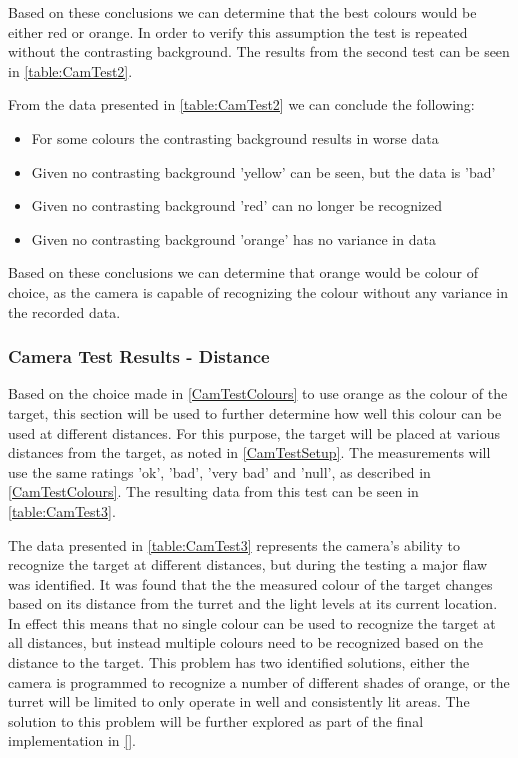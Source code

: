 Based on these conclusions we can determine that the best colours would be
either red or orange. In order to verify this assumption the test is repeated
without the contrasting background. The results from the second test can be seen
in \autoref{table:CamTest2}.


From the data presented in \autoref{table:CamTest2} we can conclude the
following:
\begin{itemize}
  \item For some colours the contrasting background results in worse data
  \item Given no contrasting background 'yellow' can be seen, but the data is
  'bad'
  \item Given no contrasting background 'red' can no longer be recognized
  \item Given no contrasting background 'orange' has no variance in data
\end{itemize}

Based on these conclusions we can determine that orange would be colour of
choice, as the camera is capable of recognizing the colour without any variance
in the recorded data.

\subsubsection{Camera Test Results - Distance}\label{CamTestDistance}
Based on the choice made in \autoref{CamTestColours} to use orange as the colour
of the target, this section will be used to further determine how well this
colour can be used at different distances. For this purpose, the target will be
placed at various distances from the target, as noted in \autoref{CamTestSetup}.
The measurements will use the same ratings 'ok', 'bad', 'very bad' and 'null',
as described in \autoref{CamTestColours}. The resulting data from this test can be
seen in \autoref{table:CamTest3}.


The data presented in \autoref{table:CamTest3} represents the camera's ability
to recognize the target at different distances, but during the testing a major
flaw was identified. It was found that the the measured colour of the target
changes based on its distance from the turret and the light levels at its
current location. In effect this means that no single colour can be used to
recognize the target at all distances, but instead multiple colours need to be
recognized based on the distance to the target. This problem has two identified
solutions, either the camera is programmed to recognize a number of different
shades of orange, or the turret will be limited to only operate in well and
consistently lit areas. The solution to this problem will be further explored
as part of the final implementation in \autoref{}.

